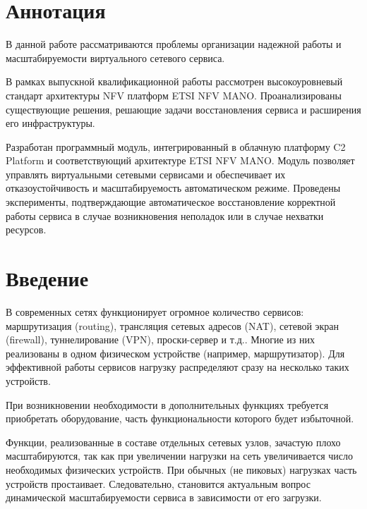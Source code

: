 \documentclass[oneside,final,14pt,a4paper]{extreport}
\begin{document}
\chapter*{Аннотация}
В данной работе рассматриваются проблемы организации надежной работы и масштабируемости виртуального сетевого сервиса.

В рамках выпускной квалификационной работы рассмотрен высокоуровневый стандарт архитектуры NFV платформ ETSI NFV MANO. Проанализированы существующие решения, решающие задачи восстановления сервиса и расширения его инфраструктуры.

Разработан программный модуль, интегрированный в облачную платформу C2 Platform и соответствующий архитектуре ETSI NFV MANO. Модуль позволяет управлять виртуальными сетевыми сервисами и обеспечивает их отказоустойчивость и масштабируемость автоматическом режиме. Проведены эксперименты, подтверждающие автоматическое восстановление корректной работы сервиса в случае возникновения неполадок или в случае нехватки ресурсов.





\tableofcontents %





\chapter*{Введение}

В современных сетях функционирует огромное количество сервисов: маршрутизация (routing), трансляция сетевых адресов (NAT), сетевой экран (firewall), туннелирование (VPN), проски-сервер и т.д.. Многие из них реализованы в одном физическом устройстве (например, маршрутизатор). Для эффективной работы сервисов нагрузку распределяют сразу на несколько таких устройств. 

При возникновении необходимости в дополнительных функциях требуется приобретать оборудование, часть функциональности которого будет избыточной. 

Функции, реализованные в составе отдельных сетевых узлов, зачастую плохо масштабируются, так как при увеличении нагрузки на сеть увеличивается число необходимых физических устройств. При обычных (не пиковых) нагрузках часть устройств простаивает. Следовательно, становится актуальным вопрос динамической масштабируемости сервиса в зависимости от его загрузки.
\end{document}
